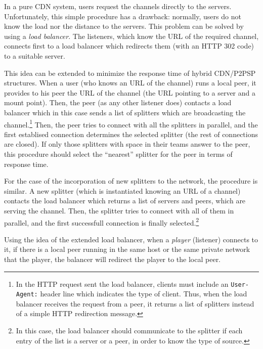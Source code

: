 
In a pure CDN system, users request the channels directly to the
servers. Unfortunately, this simple procedure has a drawback:
normally, users do not know the load nor the distance to the
servers. This problem can be solved by using a \emph{load
  balancer}. The listeners, which know the URL of the required
channel, connects first to a load balancer which redirects them (with
an HTTP 302 code) to a suitable server.

This idea can be extended to minimize the response time of hybrid
CDN/P2PSP structures. When a user (who knows an URL of the channel)
runs a local peer, it provides to his peer the URL of the channel (the
URL pointing to a server and a mount point). Then, the peer (as any
other listener does) contacts a load balancer which in this case sends
a list of splitters which are broadcasting the channel.\footnote{In
  the HTTP request sent the load balancer, clients must include an
  \texttt{User-Agent:} header line which indicates the type of
  client. Thus, when the load balancer receives the request from a
  peer, it returns a list of splitters instead of a simple HTTP
  redirection message.}  Then, the peer tries to connect with all the
splitters in parallel, and the first establised connection determines
the selected splitter (the rest of connections are closed). If only
those splitters with space in their teams answer to the peer, this
procedure should select the ``nearest'' splitter for the peer in terms
of response time.

For the case of the incorporation of new splitters to the network, the
procedure is similar. A new splitter (which is instantiated knowing an
URL of a channel) contacts the load balancer which returns a list of
servers and peers, which are serving the channel. Then, the splitter
tries to connect with all of them in parallel, and the first
successfull connection is finally selected.\footnote{In this case, the
  load balancer should communicate to the splitter if each entry of
  the list is a server or a peer, in order to know the type of
  source.}

Using the idea of the extended load balancer, when a \emph{player}
(listener) connects to it, if there is a local peer running in the
same host or the same private network that the player, the balancer
will redirect the player to the local peer.

